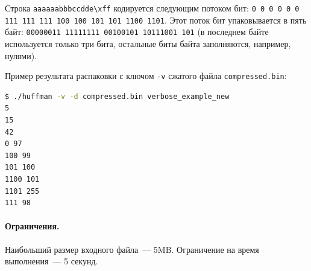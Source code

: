 \documentclass[a4paper,10pt]{article}
\begin{document}
Строка {\tt aaaaaabbbccdde\textbackslash{}xff} кодируется следующим потоком бит:
{\tt 0 0 0 0 0 0 111 111 111 100 100 101 101 1100 1101}.
Этот поток бит упаковывается в пять байт:
{\tt 00000011 11111111 00100101 10111001 101} (в последнем байте используется только три бита, остальные биты байта заполняются, например, нулями).

Пример результата распаковки с ключом {\tt -v} сжатого файла {\tt compressed.bin}:

\begin{lstlisting}[language=bash, frame=single]
$ ./huffman -v -d compressed.bin verbose_example_new
5
15
42
0 97
100 99
101 100
1100 101
1101 255
111 98
\end{lstlisting}


\paragraph{Ограничения.}
Наибольший размер входного файла~--- 5MB. Ограничение на время выполнения~--- 5 секунд.
\end{document}
